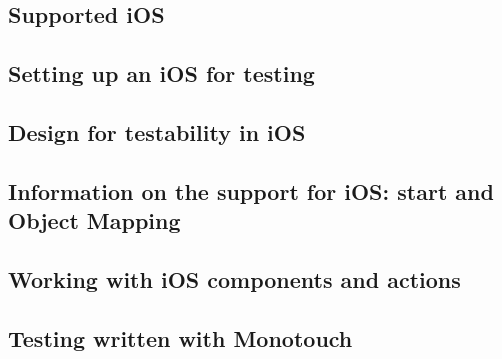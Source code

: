 

\subsection{Supported iOS \gdauts{}}


\subsection{Setting up an iOS \gdaut{} for testing}
\label{ToolkitiOSSetup}


\subsection{Design for testability in iOS \gdauts{}}
\label{ToolkitiOSDFT}


\subsection{Information on the support for iOS: \gdaut{} start and Object Mapping}


\subsection{Working with iOS components and actions}


\subsection{Testing \gdauts{} written with Monotouch}

